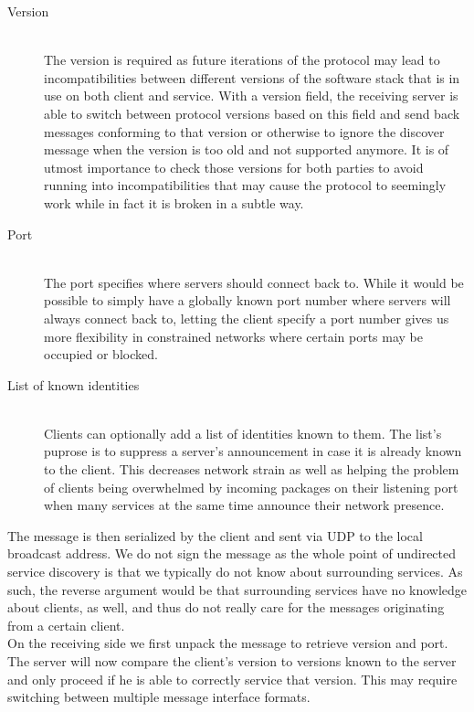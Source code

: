 \begin{description}
    \item[Version]\hfill\\
        The version is required as future iterations of the protocol may lead to incompatibilities between different versions of the software stack that is in use on both client and service.
        With a version field, the receiving server is able to switch between protocol versions based on this field and send back messages conforming to that version or otherwise to ignore the discover message when the version is too old and not supported anymore.
        It is of utmost importance to check those versions for both parties to avoid running into incompatibilities that may cause the protocol to seemingly work while in fact it is broken in a subtle way.
    \item[Port]\hfill\\
        The port specifies where servers should connect back to.
        While it would be possible to simply have a globally known port number where servers will always connect back to, letting the client specify a port number gives us more flexibility in constrained networks where certain ports may be occupied or blocked.
    \item[List of known identities]\hfill\\
        Clients can optionally add a list of identities known to them.
        The list's puprose is to suppress a server's announcement in case it is already known to the client.
        This decreases network strain as well as helping the problem of clients being overwhelmed by incoming packages on their listening port when many services at the same time announce their network presence.
\end{description}

The message is then serialized by the client and sent via UDP to the local broadcast address.
We do not sign the message as the whole point of undirected service discovery is that we typically do not know about surrounding services.
As such, the reverse argument would be that surrounding services have no knowledge about clients, as well, and thus do not really care for the messages originating from a certain client.\\

On the receiving side we first unpack the message to retrieve version and port.
The server will now compare the client's version to versions known to the server and only proceed if he is able to correctly service that version.
This may require switching between multiple message interface formats.

